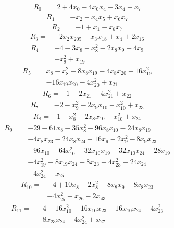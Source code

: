 \begin{align*} R_{0}={}&2 +4 x_{0} -4 x_{0}x_{4} -3 x_{4} +x_{7}
\end{align*}
\begin{align*} R_{1}={}&-x_{2} -x_{4}x_{5} +x_{6}x_{7}
\end{align*}
\begin{align*} R_{2}={}&-1 +x_{1} -x_{6}x_{7}
\end{align*}
\begin{align*} R_{3}={}&-2 x_{2}x_{205} -x_{3}x_{18} +x_{4} +2 x_{16}
\end{align*}
\begin{align*} R_{4}={}&-4 -3 x_{8} -x_{8}^{2} -2 x_{8}x_{9} -4 x_{9}
\\ &-x_{9}^{2} +x_{19}
\end{align*}
\begin{align*} R_{5}={}&x_{8} -x_{8}^{2} -8 x_{8}x_{19} -4 x_{8}x_{20} -16 x_{19}^{2}
\\ &-16 x_{19}x_{20} -4 x_{20}^{2} +x_{21}
\end{align*}
\begin{align*} R_{6}={}&1 +2 x_{21} -4 x_{21}^{2} +x_{22}
\end{align*}
\begin{align*} R_{7}={}&-2 -x_{9}^{2} -2 x_{9}x_{10} -x_{10}^{2} +x_{23}
\end{align*}
\begin{align*} R_{8}={}&1 -x_{8}^{2} -2 x_{8}x_{10} -x_{10}^{2} +x_{24}
\end{align*}
\begin{align*} R_{9}={}&-29 -61 x_{8} -35 x_{8}^{2} -96 x_{8}x_{10} -24 x_{8}x_{19}
\\ &-4 x_{8}x_{23} -24 x_{8}x_{24} +16 x_{9} -2 x_{9}^{2} -8 x_{9}x_{23}
\\ &-96 x_{10} -64 x_{10}^{2} -32 x_{10}x_{19} -32 x_{10}x_{24} -28 x_{19}
\\ &-4 x_{19}^{2} -8 x_{19}x_{24} +8 x_{23} -4 x_{23}^{2} -24 x_{24}
\\ &-4 x_{24}^{2} +x_{25}
\end{align*}
\begin{align*} R_{10}={}&-4 +10 x_{8} -2 x_{8}^{2} -8 x_{8}x_{9} -8 x_{8}x_{23}
\\ &-4 x_{25}^{2} +x_{26} -2 x_{43}
\end{align*}
\begin{align*} R_{11}={}&-4 -16 x_{10}^{2} -16 x_{10}x_{23} -16 x_{10}x_{24} -4 x_{23}^{2}
\\ &-8 x_{23}x_{24} -4 x_{24}^{2} +x_{27}
\end{align*}
